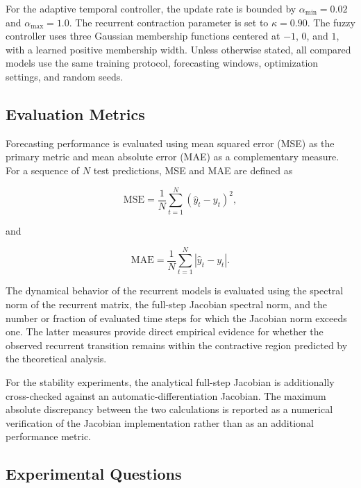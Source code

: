 \documentclass[journal]{IEEEtran}
\begin{document}
For the adaptive temporal controller, the update rate is bounded by $\alpha_{\min}=0.02$ and $\alpha_{\max}=1.0$. The recurrent contraction parameter is set to $\kappa=0.90$. The fuzzy controller uses three Gaussian membership functions centered at $-1$, $0$, and $1$, with a learned positive membership width. Unless otherwise stated, all compared models use the same training protocol, forecasting windows, optimization settings, and random seeds.

\subsection{Evaluation Metrics}
\label{subsec:metrics}

Forecasting performance is evaluated using mean squared error (MSE) as the primary metric and mean absolute error (MAE) as a complementary measure. For a sequence of $N$ test predictions, MSE and MAE are defined as

\begin{equation}
	\mathrm{MSE}
	=
	\frac{1}{N}
	\sum_{t=1}^{N}
	\left(
	\hat{y}_t-y_t
	\right)^2,
	\label{eq:mse}
\end{equation}

and

\begin{equation}
	\mathrm{MAE}
	=
	\frac{1}{N}
	\sum_{t=1}^{N}
	\left|
	\hat{y}_t-y_t
	\right|.
	\label{eq:mae}
\end{equation}

The dynamical behavior of the recurrent models is evaluated using the spectral norm of the recurrent matrix, the full-step Jacobian spectral norm, and the number or fraction of evaluated time steps for which the Jacobian norm exceeds one. The latter measures provide direct empirical evidence for whether the observed recurrent transition remains within the contractive region predicted by the theoretical analysis.

For the stability experiments, the analytical full-step Jacobian is additionally cross-checked against an automatic-differentiation Jacobian. The maximum absolute discrepancy between the two calculations is reported as a numerical verification of the Jacobian implementation rather than as an additional performance metric.

\subsection{Experimental Questions}
\label{subsec:research_questions}
\end{document}

